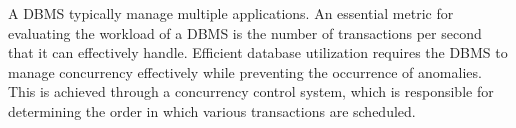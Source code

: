A DBMS typically manage multiple applications.
An essential metric for evaluating the workload of a DBMS is the number of transactions per second that it can effectively handle. 
Efficient database utilization requires the DBMS to manage concurrency effectively while preventing the occurrence of anomalies. 
This is achieved through a concurrency control system, which is responsible for determining the order in which various transactions are scheduled.